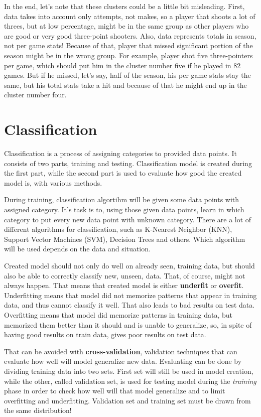 \documentclass[a4paper]{article}
\begin{document}
In the end, let's note that these clusters could be a little bit misleading. First, data takes into account only attempts, not makes, so a player that shoots a lot of threes, but at low percentage, might be in the same group as other players who are good or very good three-point shooters. Also, data represents totals in season, not per game stats! Because of that, player that missed significant portion of the season might be in the wrong group. For example, player shot five three-pointers per game, which should put him in the cluster number five if he played in 82 games. But if he missed, let's say, half of the season, his per game stats stay the same, but his total stats take a hit and because of that he might end up in the cluster number four.

\section{Classification}
\label{sec:cls}

Classification is a process of assigning categories to provided data points. It consists of two parts, training and testing. Classification model is created during the first part, while the second part is used to evaluate how good the created model is, with various methods.

During training, classification algortihm will be given some data points with assigned category. It's task is to, using those given data points, learn in which category to put every new data point with unknown category. There are a lot of different algorithms for classification, such as K-Nearest Neighbor (KNN), Support Vector Machines (SVM), Decision Trees and others. Which algorithm will be used depends on the data and situation. \cite{supervisedLearning}

Created model should not only do well on already seen, training data, but should also be able to correctly classify new, unseen, data. That, of course, might not always happen. That means that created model is either \textbf{underfit} or \textbf{overfit}. Underfitting means that model did not memorize patterns that appear in training data, and thus cannot classify it well. That also leads to bad results on test data. Overfitting means that model did memorize patterns in training data, but memorized them better than it should and is unable to generalize, so, in spite of having good results on train data, gives poor results on test data.

That can be avoided with \textbf{cross-validation}, validation techniques that can evaluate how well will model generalize new data. Evaluating can be done by dividing training data into two sets. First set will still be used in model creation, while the other, called validation set, is used for testing model during the \textit{training} phase in order to check how well will that model generalize and to limit overfitting and underfitting. Validation set and training set must be drawn from the same distribution! \cite{crossVal}
\end{document}
